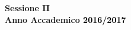 \documentclass[12pt,a4paper]{report}
\begin{document}
\begin{titlepage}
\vspace{8mm}

\begin{center}
%
%
{\large{\bf Sessione \textcolor{black}{II}
\vspace{2mm}\\
%
%
Anno Accademico \textcolor{black}{ 2016/2017}}}
\end{center}

%

\end{titlepage}
\end{document}
